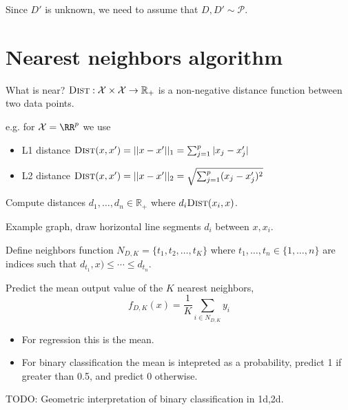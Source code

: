 \documentclass{article}
\begin{document}
Since $D'$ is unknown, we need to assume that $D,D'\sim \mathcal P$.

\section{Nearest neighbors algorithm}

What is near?
$\textsc{Dist}:\mathcal X\times \mathcal X \rightarrow \mathbb R_+$ is
a non-negative distance function between two data points.

e.g. for $\mathcal X=\RR^p$ we use
\begin{itemize}
\item L1 distance $\textsc{Dist}(x,x') = ||x-x'||_1 = \sum_{j=1}^p |x_j-x_j'|$
\item L2 distance $\textsc{Dist}(x,x') = ||x-x'||_2 = \sqrt{
\sum_{j=1}^p (x_j-x_j')^2}$
\end{itemize}

Compute distances $d_1,\dots,d_n\in\mathbb R_+$ where 
$d_i\textsc{Dist}(x_i,x)$.

Example graph, draw horizontal line segments $d_i$ between $x,x_i$.

Define neighbors function $N_{D,K} = \{t_1, t_2, \dots, t_K\}$ where
$t_1,\dots,t_n\in\{1,\dots,n\}$ are indices such that
$d_{t_1},x)\leq \cdots \leq d_{t_n}$.

Predict the mean output value of the $K$ nearest
neighbors, $$f_{D,K}(x) = \frac 1 K \sum_{i\in N_{D,K}} y_i$$

\begin{itemize}
\item For regression this is the mean.
\item For binary classification the mean is intepreted as a
  probability, predict 1 if greater than 0.5, and predict 0 otherwise.
\end{itemize}

TODO: Geometric interpretation of binary classification in 1d,2d.
\end{document}
